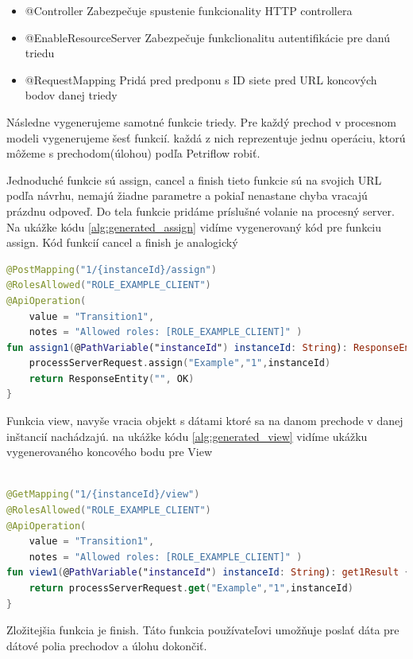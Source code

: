 \begin{itemize}
\item @Controller Zabezpečuje spustenie funkcionality HTTP controllera
\item @EnableResourceServer Zabezpečuje funkclionalitu autentifikácie pre danú triedu
\item @RequestMapping Pridá pred predponu s ID siete pred URL koncových bodov danej triedy
\end{itemize}

Následne vygenerujeme samotné funkcie triedy. Pre každý prechod v procesnom modeli vygenerujeme šesť funkcií. každá z nich reprezentuje jednu operáciu, ktorú môžeme s prechodom(úlohou) podľa Petriflow robiť.

Jednoduché funkcie sú assign, cancel a finish tieto funkcie sú na svojich URL podľa návrhu, nemajú žiadne parametre a pokiaľ nenastane chyba vracajú prázdnu odpoveď. Do tela funkcie pridáme príslušné volanie na procesný server. Na ukážke kódu \ref{alg:generated_assign} vidíme vygenerovaný kód pre funkciu assign. Kód funkcií cancel a finish je analogický

\begin{lstlisting}[float, caption={Príklad vygenerovanej funkcie},label={alg:generated_assign},language=Kotlin]
@PostMapping("1/{instanceId}/assign")
@RolesAllowed("ROLE_EXAMPLE_CLIENT")
@ApiOperation(
	value = "Transition1",
	notes = "Allowed roles: [ROLE_EXAMPLE_CLIENT]" )
fun assign1(@PathVariable("instanceId") instanceId: String): ResponseEntity<String> {
	processServerRequest.assign("Example","1",instanceId)
	return ResponseEntity("", OK)
}
\end{lstlisting}

Funkcia view, navyše vracia objekt s dátami ktoré sa na danom prechode v danej inštancií nachádzajú. na ukážke kódu \ref{alg:generated_view} vidíme ukážku vygenerovaného koncového bodu pre View

\begin{lstlisting}[float, caption={Príklad vygenerovanej funkcie},label={alg:generated_view},language=Kotlin]

@GetMapping("1/{instanceId}/view")
@RolesAllowed("ROLE_EXAMPLE_CLIENT")
@ApiOperation(
	value = "Transition1",
	notes = "Allowed roles: [ROLE_EXAMPLE_CLIENT]" )
fun view1(@PathVariable("instanceId") instanceId: String): get1Result {
	return processServerRequest.get("Example","1",instanceId)
}
\end{lstlisting}


Zložitejšia funkcia je finish. Táto funkcia používateľovi umožňuje poslať dáta pre dátové polia prechodov a úlohu dokončiť.

